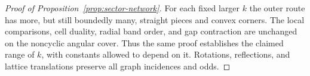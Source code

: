 \begin{proof}[Proof of Proposition~\ref{prop:sector-network}]
For each fixed larger $k$ the outer route has more, but still
boundedly many, straight pieces and convex corners.  The local
comparisons, cell duality, radial band order, and gap contraction
are unchanged on the noncyclic angular cover.  Thus the same proof
establishes the claimed range of $k$, with constants allowed to
depend on it.  Rotations, reflections, and lattice translations
preserve all graph incidences and odds.
\end{proof}
